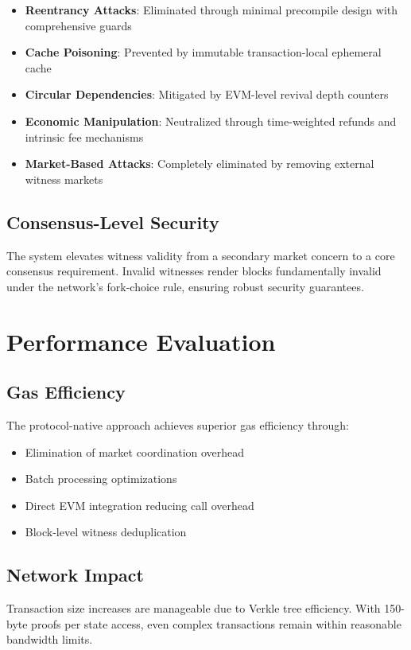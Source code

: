 \documentclass{article}
\begin{document}
\begin{itemize}
\item \textbf{Reentrancy Attacks}: Eliminated through minimal precompile design with comprehensive guards
\item \textbf{Cache Poisoning}: Prevented by immutable transaction-local ephemeral cache
\item \textbf{Circular Dependencies}: Mitigated by EVM-level revival depth counters
\item \textbf{Economic Manipulation}: Neutralized through time-weighted refunds and intrinsic fee mechanisms
\item \textbf{Market-Based Attacks}: Completely eliminated by removing external witness markets
\end{itemize}

\subsection{Consensus-Level Security}

The system elevates witness validity from a secondary market concern to a core consensus requirement. Invalid witnesses render blocks fundamentally invalid under the network's fork-choice rule, ensuring robust security guarantees.

\section{Performance Evaluation}

\subsection{Gas Efficiency}

The protocol-native approach achieves superior gas efficiency through:
\begin{itemize}
\item Elimination of market coordination overhead
\item Batch processing optimizations
\item Direct EVM integration reducing call overhead
\item Block-level witness deduplication
\end{itemize}

\subsection{Network Impact}

Transaction size increases are manageable due to Verkle tree efficiency. With 150-byte proofs per state access, even complex transactions remain within reasonable bandwidth limits.
\end{document}
